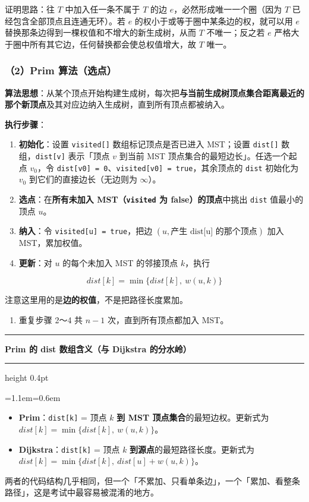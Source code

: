 \documentclass[11pt,openany,UTF8]{ctexbook}
\newcommand{\callouthead}[2]{%
  \par\addvspace{7pt}\noindent
  {\color{#1}\rule[-0.15em]{3pt}{1.05em}}\hspace{0.5em}%
  {\bfseries\color{#1}#2}\par\nobreak\vspace{-0.35em}%
  {\color{rulesep}\hrule height 0.4pt}\nobreak\vspace{0.45em}%
  \begingroup\small\setlength{\parindent}{0pt}%
  \leftskip=1.1em\rightskip=0.6em\noindent\ignorespaces}
\newcommand{\calloutend}{\par\endgroup\addvspace{7pt}}
\newenvironment{callkey}[1]{\callouthead{keybar}{#1}}{\calloutend}
\begin{document}
证明思路：往 $T$ 中加入任一条不属于 $T$ 的边 $e$，必然形成唯一一个圈（因为 $T$ 已经包含全部顶点且连通无环）。若 $e$ 的权小于或等于圈中某条边的权，就可以用 $e$ 替换那条边得到一棵权值和不增大的新生成树，从而 $T$ 不唯一；反之若 $e$ 严格大于圈中所有其它边，任何替换都会使总权值增大，故 $T$ 唯一。

\subsubsection{（2）Prim 算法（选点）}

\textbf{算法思想}：从某个顶点开始构建生成树，每次把\textbf{与当前生成树顶点集合距离最近的那个新顶点}及其对应边纳入生成树，直到所有顶点都被纳入。

\textbf{执行步骤}：

\begin{enumerate}
\item \textbf{初始化}：设置 \texttt{visited[]\allowbreak{}} 数组标记顶点是否已进入 MST；设置 \texttt{dist[]\allowbreak{}} 数组，\texttt{dist[v]\allowbreak{}} 表示「顶点 $v$ 到当前 MST 顶点集合的最短边长」。任选一个起点 $v_0$，令 \texttt{dist[v0]\allowbreak{} =\allowbreak{} 0}、\texttt{visited[v0]\allowbreak{} =\allowbreak{} true}，其余顶点的 \texttt{dist} 初始化为 $v_0$ 到它们的直接边长（无边则为 $\infty$）。
\item \textbf{选点}：在\textbf{所有未加入 MST（\texttt{visited} 为 false）的顶点}中挑出 \texttt{dist} 值最小的顶点 $u$。
\item \textbf{纳入}：令 \texttt{visited[u]\allowbreak{} =\allowbreak{} true}，把边 $(u, \text{产生 dist[u] 的那个顶点})$ 加入 MST，累加权值。
\item \textbf{更新}：对 $u$ 的每个未加入 MST 的邻接顶点 $k$，执行
\end{enumerate}
\[dist[k]=\min\{dist[k],\ w(u,k)\}\]

注意这里用的是\textbf{边的权值}，不是把路径长度累加。

\begin{enumerate}
\item 重复步骤 2～4 共 $n-1$ 次，直到所有顶点都加入 MST。
\end{enumerate}
\begin{callkey}{Prim 的 dist 数组含义（与 Dijkstra 的分水岭）}
\begin{itemize}
\item \textbf{Prim}：\texttt{dist[k]\allowbreak{}} = 顶点 $k$ \textbf{到 MST 顶点集合}的最短边权。更新式为 $dist[k]=\min\{dist[k],\ w(u,k)\}$。
\item \textbf{Dijkstra}：\texttt{dist[k]\allowbreak{}} = 顶点 $k$ \textbf{到源点}的最短路径长度。更新式为 $dist[k]=\min\{dist[k],\ dist[u]+w(u,k)\}$。
\end{itemize}
两者的代码结构几乎相同，但一个「不累加、只看单条边」，一个「累加、看整条路径」，这是考试中最容易被混淆的地方。

\end{callkey}
\end{document}
